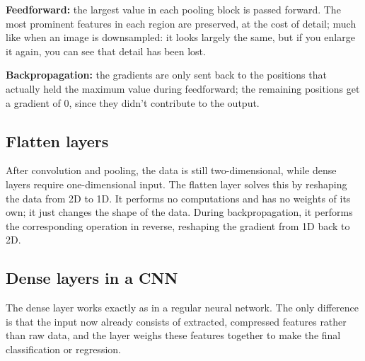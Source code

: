 \textbf{Feedforward:} the largest value in each pooling block is passed forward. The most prominent
features in each region are preserved, at the cost of detail; much like when an image is
downsampled: it looks largely the same, but if you enlarge it again, you can see that detail has
been lost.

\textbf{Backpropagation:} the gradients are only sent back to the positions that actually held the
maximum value during feedforward; the remaining positions get a gradient of 0, since they didn't
contribute to the output.

\subsection{Flatten layers}
After convolution and pooling, the data is still two-dimensional, while dense layers require
one-dimensional input. The flatten layer solves this by reshaping the data from 2D to 1D. It
performs no computations and has no weights of its own; it just changes the shape of the data.
During backpropagation, it performs the corresponding operation in reverse, reshaping the gradient
from 1D back to 2D.

\subsection{Dense layers in a CNN}
The dense layer works exactly as in a regular neural network. The only difference is that the input
now already consists of extracted, compressed features rather than raw data, and the layer weighs
these features together to make the final classification or regression.

